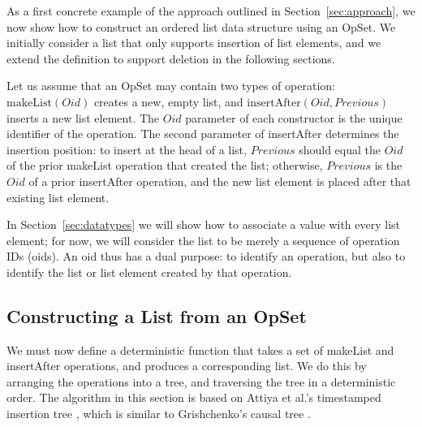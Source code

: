As a first concrete example of the approach outlined in Section~\ref{sec:approach}, we now show how to construct an ordered list data structure using an OpSet.
We initially consider a list that only supports insertion of list elements, and we extend the definition to support deletion in the following sections.

Let us assume that an OpSet may contain two types of operation:
$\mathrm{makeList}(\mathit{Oid})$ creates a new, empty list, and
$\mathrm{insertAfter}(\mathit{Oid}, \mathit{Previous})$ inserts a new list element.
The $\mathit{Oid}$ parameter of each constructor is the unique identifier of the operation.
The second parameter of insertAfter determines the insertion position: to insert at the head of a list, $\mathit{Previous}$ should equal the $\mathit{Oid}$ of the prior makeList operation that created the list; otherwise, $\mathit{Previous}$ is the $\mathit{Oid}$ of a prior insertAfter operation, and the new list element is placed after that existing list element.

In Section~\ref{sec:datatypes} we will show how to associate a value with every list element; for now, we will consider the list to be merely a sequence of operation IDs (oids).
An oid thus has a dual purpose: to identify an operation, but also to identify the list or list element created by that operation.

\subsection{Constructing a List from an OpSet}

We must now define a deterministic function that takes a set of makeList and insertAfter operations, and produces a corresponding list.
We do this by arranging the operations into a tree, and traversing the tree in a deterministic order.
The algorithm in this section is based on Attiya et al.'s timestamped insertion tree \cite{Attiya:2016kh}, which is similar to Grishchenko's causal tree \cite{Grishchenko:2014eh}.


